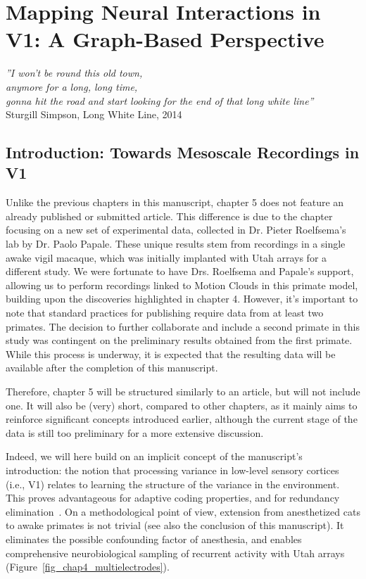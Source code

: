 \chapter{Mapping Neural Interactions in V1: A Graph-Based Perspective}

\begin{flushright}
    \textit{''I won't be round this old town,  \\
            anymore for a long, long time, \\
            gonna hit the road and start looking for the end of that long white line''}\\
        Sturgill Simpson, Long White Line, 2014
\end{flushright}

\chaptertoc{}
\section{Introduction: Towards Mesoscale Recordings in V1}
Unlike the previous chapters in this manuscript, chapter 5 does not feature an already published or submitted article. This difference is due to the chapter focusing on a new set of experimental data, collected in Dr. Pieter Roelfsema's lab by Dr. Paolo Papale. These unique results stem from recordings in a single awake vigil macaque, which was initially implanted with Utah arrays for a different study. We were fortunate to have Drs. Roelfsema and Papale's support, allowing us to perform recordings linked to Motion Clouds in this primate model, building upon the discoveries highlighted in chapter 4.
However, it's important to note that standard practices for publishing require data from at least two primates. The decision to further collaborate and include a second primate in this study was contingent on the preliminary results obtained from the first primate. While this process is underway, it is expected that the resulting data will be available after the completion of this manuscript.

Therefore, chapter 5 will be structured similarly to an article, but will not include one. It will also be (very) short, compared to other chapters, as it mainly aims to reinforce significant concepts introduced earlier, although the current stage of the data is still too preliminary for a more extensive discussion.

Indeed, we will here build on an implicit concept of the manuscript's introduction: the notion that processing variance in low-level sensory cortices (i.e., \gls{V1}) relates to learning the structure of the variance in the environment. This proves advantageous for adaptive coding properties, and for redundancy elimination~\cite{barlow1961possible}. On a methodological point of view, extension from anesthetized cats to awake primates is not trivial (see also the conclusion of this manuscript). It eliminates the possible confounding factor of anesthesia, and enables comprehensive neurobiological sampling of recurrent activity with Utah arrays (Figure~\ref{fig_chap4_multielectrodes}).

